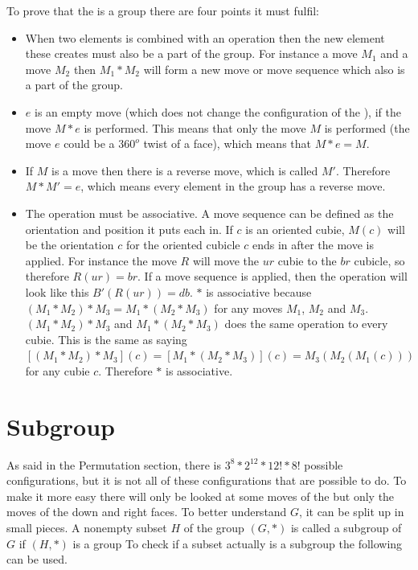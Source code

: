 To prove that the \rubik{} is a group there are four points it must fulfil:

\begin {itemize}
\item When two elements is combined with an operation then the new element these creates must also be a part of the group. For instance a move $M_1$ and a move $M_2$ then $M_1 * M_2$ will form a new move or move sequence which also is a part of the group.

\item $e$ is an empty move (which does not change the configuration of the \rubik{}), if the move $M * e$ is performed. This means that only the move $M$ is performed (the move $e$ could be a $360^o$ twist of a face), which means that $M*e=M$.

\item If $M$ is a move then there is a reverse move, which is called $M'$. Therefore $M*M' = e$, which means every element in the group has a reverse move.

\item The operation must be associative. A move sequence can be defined as the orientation and position it puts each \cpiece{} in. If $c$ is an oriented  cubie, $M(c)$ will be the orientation $c$ for the oriented cubicle $c$ ends in after the move is applied. For instance the move $R$ will move the $ur$ cubie to the $br$ cubicle, so therefore $R(ur)=br$. If a move sequence is applied, then the operation will look like this $B'(R(ur))=db$.
$*$ is associative because $(M_1 *M_2 )*M_3 = M_1 *(M_2 *M_3 )$ for any moves $M_1$, $M_2$ and $M_3$. $(M_1 *M_2 )*M_3$ and $M_1 *(M_2 *M_3 )$ does the same operation to every cubie. This is the same as saying $[(M_1 *M_2 )*M_3 ](c)=[M_1 *(M_2 *M_3 )](c)=M_3 (M_2 (M_1 (c)))$ for any cubie $c$. Therefore $*$ is associative.

\end {itemize}

\section{Subgroup}
As said in the Permutation section, there is $3^8*2^{12}*12!*8!$ possible configurations, but it is not all of these configurations that are possible to do.  To make it more easy there will only be looked at some moves of the \rubik{} but only the moves of the down and right faces. To better understand $G$, it can be split up in small pieces.
A nonempty subset $H$ of the group $(G,*)$ is called a subgroup of $G$ if $(H,*)$ is a group
To check if a subset actually is a subgroup the following can be used.


